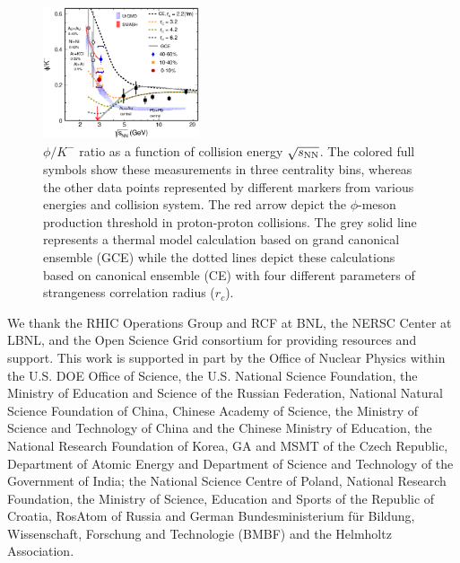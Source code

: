 \documentclass[%
 reprint,	
showpacs,
 amsmath,amssymb,
 aps,
 prc,
]{revtex4-1}
\begin{document}
\begin{figure}
\centering
\includegraphics[width=0.41\textwidth]{fig/fig4_phi_over_kminus_zoomin.eps}
  \caption{ $\phi/K^-$ ratio as a function of collision energy $\sqrt{s_{\rm NN}}$. The colored full symbols show these measurements in three centrality bins, whereas the other data points represented by different markers from various energies and collision system. The red arrow depict the $\phi$-meson production threshold in proton-proton collisions. The grey solid line represents a thermal model calculation based on grand canonical ensemble (GCE) while the dotted lines depict these calculations based on canonical ensemble (CE) with four different parameters of strangeness correlation radius ($r_c$).}
\label{fig:phi2Kratio} 
\end{figure}







We thank the RHIC Operations Group and RCF at BNL, the NERSC Center at LBNL, and the Open Science Grid consortium for providing resources and support. This work is supported in part by the Office of Nuclear Physics within the U.S. DOE Office of Science, the U.S. National Science Foundation, the Ministry of Education and Science of the Russian Federation, National Natural Science Foundation of China, Chinese Academy of Science, the Ministry of Science and Technology of China and the Chinese Ministry of Education, the National Research Foundation of Korea, GA and MSMT of the Czech Republic, Department of Atomic Energy and Department of Science and Technology of the Government of India; the National Science Centre of Poland, National Research Foundation, the Ministry of Science, Education and Sports of the Republic of Croatia, RosAtom of Russia and German Bundesministerium f{\"u}r Bildung, Wissenschaft, Forschung and Technologie (BMBF) and the Helmholtz Association.


\end{document}
